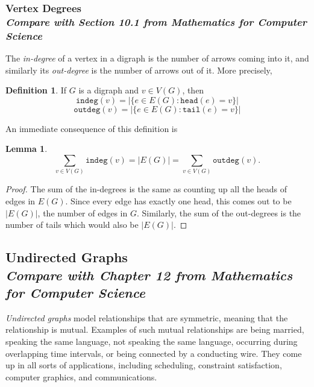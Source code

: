 \documentclass[11pt,oneside]{book}
\newtheorem{lem}[thm]{Lemma}
\theoremstyle{definition}
\newtheorem{defn}[thm]{Definition}
\begin{document}
\subsubsection[Vertex Degrees]{Vertex Degrees\\[0.5ex]
\normalsize\normalfont\textit{
    Compare with Section 10.1 from \emph{Mathematics for Computer Science}
}}
The \emph{in-degree} of a vertex in a digraph is the number of arrows coming into it, and similarly its \emph{out-degree} is the number of arrows out of it.
More precisely,
\begin{defn}
  If $G$ is a digraph and $v \in V(G)$, then
  \[ \texttt{indeg}(v) = |\{ e \in E(G) : \texttt{head}(e) = v \}| \]
  \[ \texttt{outdeg}(v) = |\{ e \in E(G) : \texttt{tail}(e) = v \}| \]
\end{defn}

An immediate consequence of this definition is

\begin{lem}
  \[ \sum_{v \in V(G)} \texttt{indeg}(v) = |E(G)| = \sum_{v \in V(G)} \texttt{outdeg}(v). \]
\end{lem}
\begin{proof}
The sum of the in-degrees is the same as counting up all the heads of edges in $E(G)$.
Since every edge has exactly one head, this comes out to be $|E(G)|$, the number of edges in $G$.
Similarly, the sum of the out-degrees is the number of tails which would also be $|E(G)|$.
\end{proof}


\subsection[Undirected Graphs]{Undirected Graphs\\[0.5ex]
\normalsize\normalfont\textit{
    Compare with Chapter 12 from \emph{Mathematics for Computer Science}
}}
\emph{Undirected graphs} model relationships that are symmetric, meaning that the relationship is mutual.
Examples of such mutual relationships are being married, speaking the same language, not speaking the same language, occurring during overlapping time intervals, or being connected by a conducting wire.
They come up in all sorts of applications, including scheduling, constraint satisfaction, computer graphics, and communications.
\end{document}
